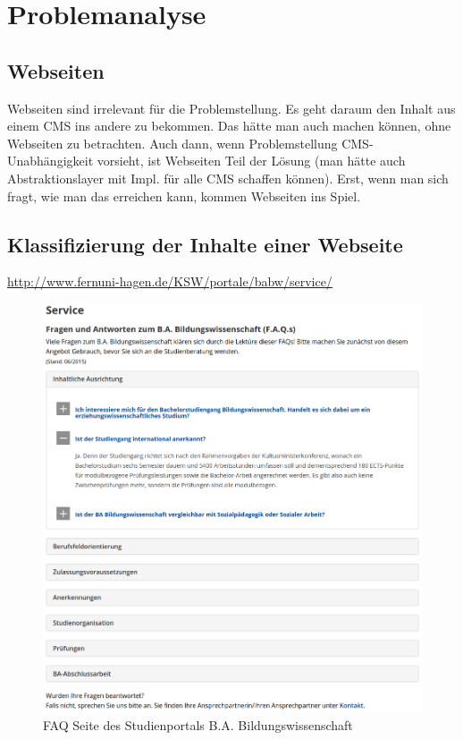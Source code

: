 \chapter{Problemanalyse}
    \label{chapter:ProblemAnalysis}
    \section{Webseiten}
        Webseiten sind irrelevant für die Problemstellung.
        Es geht daraum den Inhalt aus einem CMS ins andere zu bekommen.
        Das hätte man auch machen können, ohne Webseiten zu betrachten.
        Auch dann, wenn Problemstellung CMS-Unabhängigkeit vorsieht,
        ist Webseiten Teil der Lösung (man hätte auch Abstraktionslayer mit Impl. für alle CMS schaffen können).
        Erst, wenn man sich fragt, wie man das erreichen kann, kommen Webseiten ins Spiel.

    \section{\imperia}
    \section{\wordpress}
    \section{Klassifizierung der Inhalte einer Webseite}
        \url{http://www.fernuni-hagen.de/KSW/portale/babw/service/}

        \begin{figure}
            \centering
            \includegraphics[width=\textwidth]{../resources/babw_service_faq.png}
            \caption{FAQ Seite des Studienportals B.A. Bildungswissenschaft}
            \label{image:BuildingBlocks}
        \end{figure}